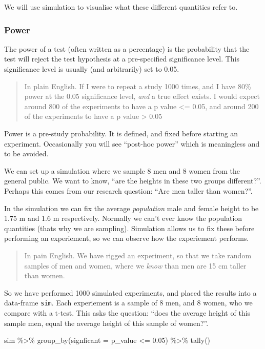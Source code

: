 \documentclass[
]{article}
\newenvironment{Shaded}{\begin{snugshade}}{\end{snugshade}}
\newcommand{\AttributeTok}[1]{\textcolor[rgb]{0.77,0.63,0.00}{#1}}
\newcommand{\FloatTok}[1]{\textcolor[rgb]{0.00,0.00,0.81}{#1}}
\newcommand{\FunctionTok}[1]{\textcolor[rgb]{0.00,0.00,0.00}{#1}}
\newcommand{\NormalTok}[1]{#1}
\newcommand{\SpecialCharTok}[1]{\textcolor[rgb]{0.00,0.00,0.00}{#1}}
\begin{document}
We will use simulation to visualise what these different quantities
refer to.

\hypertarget{power}{%
\subsubsection{Power}\label{power}}

The power of a test (often written as a percentage) is the probability
that the test will reject the test hypothesis at a pre-specified
significance level. This significance level is usually (and arbitrarily)
set to 0.05.

\begin{quote}
In plain English. If I were to repeat a study 1000 times, and I have
80\% power at the 0.05 significance level, \emph{and} a true effect
exists. I would expect around 800 of the experiments to have a p value
\textless= 0.05, and around 200 of the experiments to have a p value
\textgreater{} 0.05
\end{quote}

Power is a pre-study probability. It is defined, and fixed before
starting an experiment. Occasionally you will see ``post-hoc power''
which is meaningless and to be avoided.

We can set up a simulation where we sample 8 men and 8 women from the
general public. We want to know, ``are the heights in these two groups
different?''. Perhaps this comes from our research question: ``Are men
taller than women?''.

In the simulation we can fix the average \emph{population} male and
female height to be 1.75 m and 1.6 m respectively. Normally we can't
ever know the population quantities (thats why we are sampling).
Simulation allows us to fix these before performing an experiement, so
we can observe how the experiement performs.

\begin{quote}
In pain English. We have rigged an experiment, so that we take random
samples of men and women, where we \emph{know} than men are 15 cm taller
than women.
\end{quote}

So we have performed 1000 simulated experiments, and placed the results
into a data-frame \texttt{sim}. Each experiement is a sample of 8 men,
and 8 women, who we compare with a t-test. This asks the question:
``does the average height of this sample men, equal the average height
of this sample of women?''.

\begin{Shaded}
\begin{Highlighting}[]
\NormalTok{sim }\SpecialCharTok{\%\textgreater{}\%}
  \FunctionTok{group\_by}\NormalTok{(}\AttributeTok{signficant =}\NormalTok{ p\_value }\SpecialCharTok{\textless{}=} \FloatTok{0.05}\NormalTok{) }\SpecialCharTok{\%\textgreater{}\%}
  \FunctionTok{tally}\NormalTok{()}
\end{Highlighting}
\end{Shaded}
\end{document}
